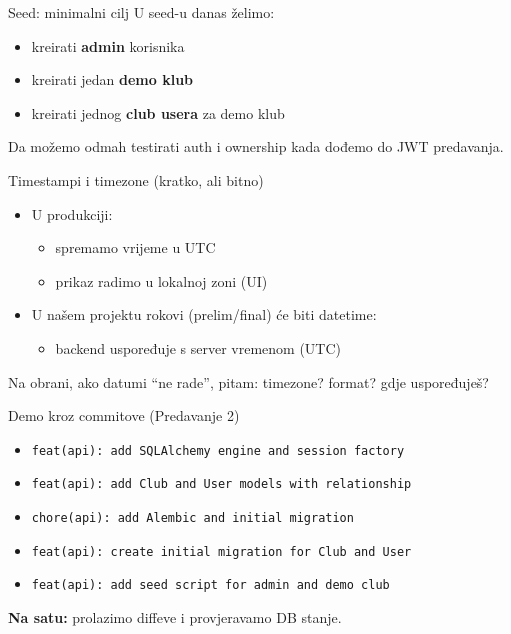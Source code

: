 	\begin{frame}{Seed: minimalni cilj}
		U seed-u danas želimo:
		\begin{itemize}
			\item kreirati \textbf{admin} korisnika
			\item kreirati jedan \textbf{demo klub}
			\item kreirati jednog \textbf{club usera} za demo klub
		\end{itemize}
		
		\vspace{0.6em}
		Da možemo odmah testirati auth i ownership kada dođemo do JWT predavanja.
	\end{frame}
	
	\begin{frame}{Timestampi i timezone (kratko, ali bitno)}
		\begin{itemize}
			\item U produkciji:
			\begin{itemize}
				\item spremamo vrijeme u UTC
				\item prikaz radimo u lokalnoj zoni (UI)
			\end{itemize}
			\item U našem projektu rokovi (prelim/final) će biti datetime:
			\begin{itemize}
				\item backend uspoređuje s server vremenom (UTC)
			\end{itemize}
		\end{itemize}
		
		\vspace{0.6em}
		Na obrani, ako datumi \enquote{ne rade}, pitam: timezone? format? gdje uspoređuješ?
	\end{frame}
	
	\begin{frame}{Demo kroz commitove (Predavanje 2)}
		\begin{itemize}
			\item \texttt{feat(api): add SQLAlchemy engine and session factory}
			\item \texttt{feat(api): add Club and User models with relationship}
			\item \texttt{chore(api): add Alembic and initial migration}
			\item \texttt{feat(api): create initial migration for Club and User}
			\item \texttt{feat(api): add seed script for admin and demo club}
		\end{itemize}
		
		\vspace{0.6em}
		\textbf{Na satu:} prolazimo diffeve i provjeravamo DB stanje.
	\end{frame}
	
